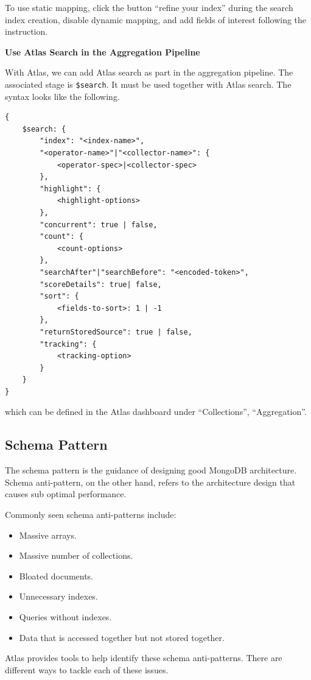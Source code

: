 To use static mapping, click the button ``refine your index'' during the search index creation, disable dynamic mapping, and add fields of interest following the instruction.

\vspace{0.1in}
\noindent \textbf{Use Atlas Search in the Aggregation Pipeline}
\vspace{0.1in}

With Atlas, we can add Atlas search as part in the aggregation pipeline. The associated stage is \verb|$search|. It must be used together with Atlas search. The syntax looks like the following.

\begin{lstlisting}
{
	$search: {
		"index": "<index-name>",
		"<operator-name>"|"<collector-name>": {
			<operator-spec>|<collector-spec>
		},
		"highlight": {
			<highlight-options>
		},
		"concurrent": true | false,
		"count": {
			<count-options>
		},
		"searchAfter"|"searchBefore": "<encoded-token>",
		"scoreDetails": true| false,
		"sort": {
			<fields-to-sort>: 1 | -1
		},
		"returnStoredSource": true | false,
		"tracking": {
			<tracking-option>
		}
	}
}
\end{lstlisting}
which can be defined in the Atlas dashboard under ``Collections'', ``Aggregation''.

\subsection{Schema Pattern}

The schema pattern is the guidance of designing good MongoDB architecture. Schema anti-pattern, on the other hand, refers to the architecture design that causes sub optimal performance.

Commonly seen schema anti-patterns include:
\begin{itemize}
	\item Massive arrays.
	\item Massive number of collections.
	\item Bloated documents.
	\item Unnecessary indexes.
	\item Queries without indexes.
	\item Data that is accessed together but not stored together.
\end{itemize}

Atlas provides tools to help identify these schema anti-patterns. There are different ways to tackle each of these issues.



